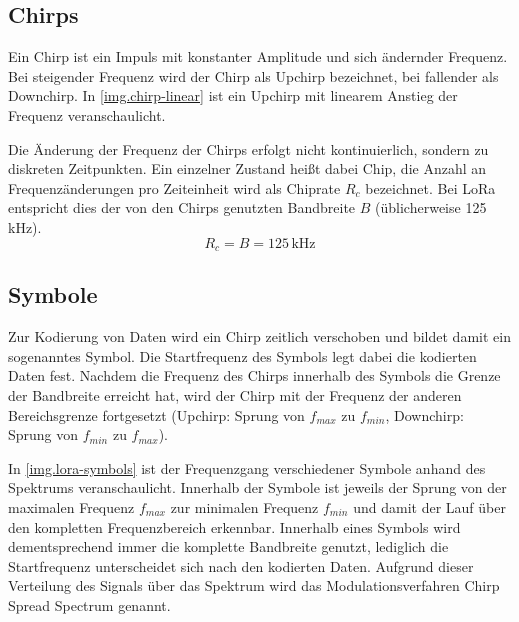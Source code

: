 \subsection{Chirps}\label{sec.lora.modulation.chirp}
Ein Chirp ist ein Impuls mit konstanter Amplitude und sich ändernder Frequenz.
Bei steigender Frequenz wird der Chirp als Upchirp bezeichnet, bei fallender als Downchirp.
In \autoref{img.chirp-linear} ist ein Upchirp mit linearem Anstieg der Frequenz veranschaulicht.

Die Änderung der Frequenz der Chirps erfolgt nicht kontinuierlich, sondern zu diskreten Zeitpunkten.
Ein einzelner Zustand heißt dabei Chip, die Anzahl an Frequenzänderungen pro Zeiteinheit wird als Chiprate $R_c$ bezeichnet.
Bei LoRa entspricht dies der von den Chirps genutzten Bandbreite $B$ (üblicherweise 125\,kHz).
\cite[S. 10]{loramodulation}
\begin{equation}
	R_c = B = 125\,\mathrm{kHz}
	\label{eq.chip-rate}
\end{equation}


\subsection{Symbole}
Zur Kodierung von Daten wird ein Chirp zeitlich verschoben und bildet damit ein sogenanntes Symbol.
Die Startfrequenz des Symbols legt dabei die kodierten Daten fest.
Nachdem die Frequenz des Chirps innerhalb des Symbols die Grenze der Bandbreite erreicht hat, wird der Chirp mit der Frequenz der anderen Bereichsgrenze fortgesetzt (Upchirp: Sprung von $f_{max}$ zu $f_{min}$, Downchirp: Sprung von $f_{min}$ zu $f_{max}$).
\cite{lorachirps}

In \autoref{img.lora-symbols} ist der Frequenzgang verschiedener Symbole anhand des Spektrums veranschaulicht.
Innerhalb der Symbole ist jeweils der Sprung von der maximalen Frequenz $f_{max}$ zur minimalen Frequenz $f_{min}$ und damit der Lauf über den kompletten Frequenzbereich erkennbar.
Innerhalb eines Symbols wird dementsprechend immer die komplette Bandbreite genutzt, lediglich die Startfrequenz unterscheidet sich nach den kodierten Daten.
Aufgrund dieser Verteilung des Signals über das Spektrum wird das Modulationsverfahren Chirp Spread Spectrum genannt.


